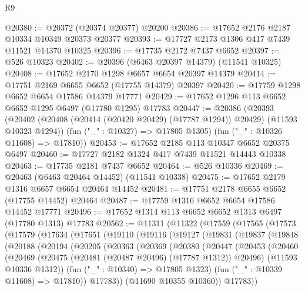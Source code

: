 \begin{lexlean}{R9}
\begin{coremodule}
@20380 := @20372 (@20374 @20377) @20200
@20386 := @17652 @2176 @2187 @10334 @10349 @20373 @20377
@20393 := @17727 @2173 @1306 @417 @7439 @11521 @14370 @10325
@20396 := @17735 @2172 @7437 @6652
@20397 := @526 @10323
@20402 := @20396 (@6463 @20397 @14379) (@11541 @10325)
@20408 := @17652 @2170 @1298 @6657 @6654 @20397 @14379
@20414 := @17751 @2169 @6655 @6652 (@17755 @14379) @20397
@20420 := @17759 @1298 @6652 @6654 @17586 @14379 @17771
@20429 := @17652 @1296 @113 @6652 @6652 @1295 @6497 (@17780 @1295) @17783
@20447 := @20386
    (@20393
      (@20402 (@20408 (@20414 (@20420 @20429) (@17787 @1294)) @20429) (@11593 @10323 @1294))
      (fun ("_" : @10327) => @17805 @1305)
      (fun ("_" : @10326 @11608) => @17810))
@20453 := @17652 @2185 @113 @10347 @6652 @20375 @6497
@20460 := @17727 @2182 @1324 @417 @7439 @11521 @14443 @10338
@20463 := @17735 @2181 @7437 @6652
@20464 := @526 @10336
@20469 := @20463 (@6463 @20464 @14452) (@11541 @10338)
@20475 := @17652 @2179 @1316 @6657 @6654 @20464 @14452
@20481 := @17751 @2178 @6655 @6652 (@17755 @14452) @20464
@20487 := @17759 @1316 @6652 @6654 @17586 @14452 @17771
@20496 := @17652 @1314 @113 @6652 @6652 @1313 @6497 (@17780 @1313) @17783
@20562 := @11311
    (@11322
      (@17559
        (@17565
          (@17573
            (@17579
              (@17634
                (@17651
                  (@19110
                    (@19116
                      (@19127
                        (@19831
                          (@19837
                            (@19848
                              (@20188
                                (@20194
                                  (@20205
                                    (@20363
                                      (@20369
                                        (@20380
                                          (@20447
                                            (@20453
                                              (@20460
                                                (@20469
                                                  (@20475
                                                    (@20481 (@20487 @20496) (@17787 @1312))
                                                    @20496)
                                                  (@11593 @10336 @1312))
                                                (fun ("_" : @10340) => @17805 @1323)
                                                (fun ("_" : @10339 @11608) => @17810))
                                              @17783))
                                          (@11690 @10355 @10360))
                                        @17783))

\end{coremodule}
\end{lexlean}
